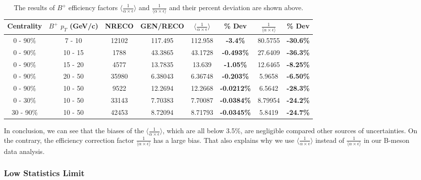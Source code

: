 \begin{table}[h]
\begin{center}
\caption{The results of $B^+$ efficiency factors $\langle \frac{1}{\alpha \times \epsilon} \rangle$ and $\frac{1}{\langle \alpha \times \epsilon \rangle}$ and their percent deviation are shown above.}
\vspace{1em}
\label{BPHighStat}
  \begin{tabular}{| c | c |c |c |c | c |  c| c|}
    \hline
     Centrality &  $B^+$   $p_T$ (GeV/c) & NRECO & GEN/RECO &  $\langle \frac{1}{\alpha \times \epsilon} \rangle$  & \% Dev & $\frac{1}{\langle \alpha \times \epsilon \rangle}$ &  \% Dev \\
    \hline
    \hline
0 - 90\% & 7 - 10 & 12102 & 117.495 & 112.958 & \textbf{-3.4\% }& 80.5755 &  \textbf{-30.6\% }   \\ 
0 - 90\% & 10 - 15 & 1788 & 43.3865 & 43.1728 & \textbf{-0.493\% }& 27.6409 &  \textbf{-36.3\% }   \\ 
0 - 90\% & 15 - 20 & 4577 & 13.7835 & 13.639 & \textbf{-1.05\% }& 12.6465 &  \textbf{-8.25\% }   \\ 
0 - 90\% & 20 - 50 & 35980 & 6.38043 & 6.36748 & \textbf{-0.203\% }& 5.9658 &  \textbf{-6.50\% }   \\ 
0 - 90\% & 10 - 50 & 9522 & 12.2694 & 12.2668 & \textbf{-0.0212\% }& 6.5642 &  \textbf{-28.3\% }   \\ 
0 - 30\% & 10 - 50 & 33143 & 7.70383 & 7.70087 & \textbf{-0.0384\% }& 8.79954 &  \textbf{-24.2\% }   \\ 
30 - 90\% & 10 - 50 & 42453 & 8.72094 & 8.71793 & \textbf{-0.0345\% }& 5.8419 &  \textbf{-24.7\% }   \\ 
    \hline
    \hline
\end{tabular}
\end{center}
\end{table}


In conclusion, we can see that the biases of the $\langle \frac{1}{\alpha \times \epsilon}\rangle$, which are all below 3.5\%, are negligible compared other sources of uncertainties. On the contrary, the efficiency correction factor $\frac{1}{\langle \alpha \times \epsilon \rangle}$ has a large bias. That also explains why we use $\langle \frac{1}{\alpha \times \epsilon}\rangle$ instead of $\frac{1}{\langle \alpha \times \epsilon \rangle}$ in our B-meson data analysis.



\subsubsection{Low Statistics Limit}

